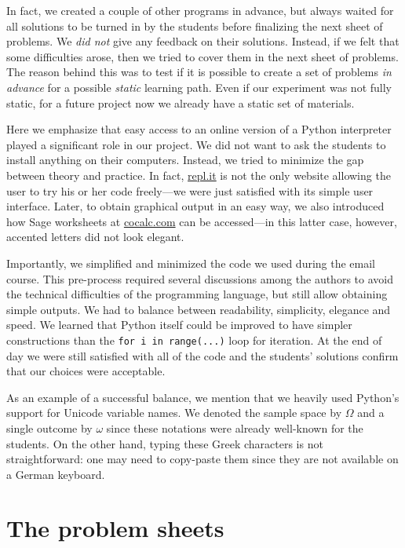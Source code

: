 \documentclass[]{interact}
\theoremstyle{plain}%
\theoremstyle{definition}
\theoremstyle{remark}
\begin{document}
In fact, we created a couple of other programs in advance, but always waited for
all solutions to be turned in by the students before finalizing the next sheet of problems.
We \textit{did not} give any feedback on their solutions. Instead, if we felt that
some difficulties arose, then we tried to cover them in the next sheet of problems.
The reason behind this was to test if it is possible to create a set of problems
\textit{in advance} for a possible \textit{static} learning path. Even if our experiment
was not fully static, for a future project now we already have a static set of materials.

Here we emphasize that easy access to an online version of a Python interpreter
played a significant role in our project. We did not want to ask the students
to install anything on their computers. Instead, we tried to minimize the gap
between theory and practice. In fact, \url{repl.it} is not the only website
allowing the user to try his or her code freely---we were just
satisfied with its simple user interface. Later, to obtain graphical output in an easy way, we also
introduced how Sage worksheets at \url{cocalc.com} can be accessed---in this latter case,
however, accented letters did not look elegant.

Importantly, we simplified and minimized the code we used during the email course.
This pre-process required several discussions among the authors to avoid
the technical difficulties of the programming language, but still allow
obtaining simple outputs. We had to balance between readability, simplicity,
elegance and speed. We learned that Python itself could be improved to
have simpler constructions than the \texttt{for i in range(...)} loop for iteration.
At the end of day we were still satisfied with all of the code and the students'
solutions confirm that our choices were acceptable.

As an example of a successful balance, we mention that we heavily used Python's support
for Unicode variable names.
We denoted the sample space by $\Omega$ and a single outcome by $\omega$ since
these notations were already well-known for the students. On the other hand,
typing these Greek characters is not straightforward: one may need to copy-paste
them since they are not available on a German keyboard.

\section{The problem sheets}
\label{problem-sheets}
\end{document}
